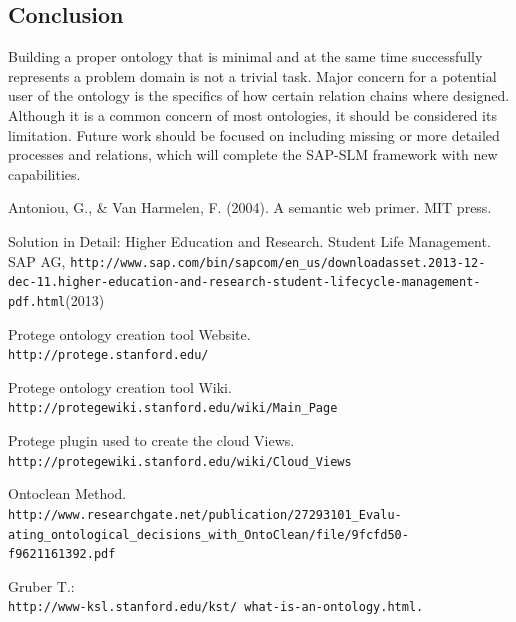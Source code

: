 \documentclass{article}    %
\begin{document}
\subsection{Conclusion}
%
Building a proper ontology that is minimal and at the same time successfully represents a problem domain is not a trivial task. Major concern for a potential user of the ontology is the specifics of how certain relation chains where designed. Although it is a common concern of most ontologies, it should be considered its limitation. Future work should be focused on including missing or more detailed processes and relations, which will complete the SAP-SLM framework with new capabilities.
%
%
\begin{thebibliography}{99}
%
Antoniou, G., \& Van Harmelen, F. (2004). A semantic web primer. MIT press.

Solution in Detail: Higher Education and Research. Student Life Management.
SAP AG, \texttt{http://www.sap.com/bin/sapcom/en\_us/downloadasset.2013-12-dec-11.higher-education-and-research-student-lifecycle-\newline management-pdf.html}(2013)

Protege ontology creation tool Website.\\
\texttt{http://protege.stanford.edu/}

Protege ontology creation tool Wiki.\\
\texttt{http://protegewiki.stanford.edu/wiki/Main\_Page}

Protege plugin used to create the cloud Views.\\
\texttt{http://protegewiki.stanford.edu/wiki/Cloud\_Views}

Ontoclean Method.\\
\texttt{http://www.researchgate.net/publication/27293101\_Evalu-\newline
ating\_ontological\_decisions\_with\_OntoClean/file/9fcfd50-\newline
f9621161392.pdf}

Gruber T.:
\\
\texttt{http://www-ksl.stanford.edu/kst/ what-is-an-ontology.html.} 



\end{thebibliography}
\end{document}
